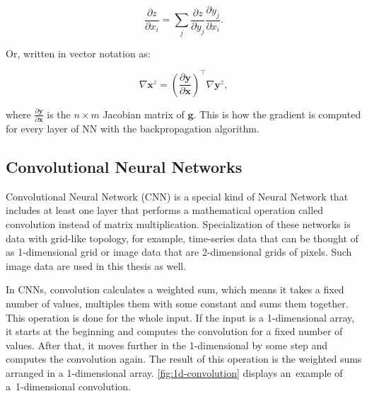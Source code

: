 $$\frac{\partial z}{\partial x_i} = \sum\limits_{j} \frac{\partial z}{\partial y_j} \frac{\partial y_j}{\partial x_i} .$$

\newpage
\noindent Or, written in vector notation as:
    
$$ \nabla \pmb x ^z = \left( \frac{\partial \pmb y }{\partial \pmb x } \right) ^\top \nabla \pmb y ^z ,$$

\noindent where $\frac{\partial \pmb y }{\partial \pmb x }$ is the $n \times m$ Jacobian matrix of $\pmb g$. This is how the gradient is computed for every layer of NN with the backpropagation algorithm.

\subsection*{Convolutional Neural Networks}
Convolutional Neural Network (CNN) is a special kind of Neural Network that includes at least one layer that performs a mathematical operation called convolution instead of matrix multiplication. Specialization of these networks is data with grid-like topology, for example, time-series data that can be thought of as 1-dimensional grid or image data that are 2-dimensional grids of pixels. Such image data are used in this thesis as well.

In CNNs, convolution calculates a weighted sum, which means it takes a fixed number of values, multiples them with some constant and sums them together. This operation is done for the whole input. If the input is a 1-dimensional array, it starts at the beginning and computes the convolution for a fixed number of values. After that, it moves further in the 1-dimensional by some step and computes the convolution again. The result of this operation is the weighted sums arranged in a 1-dimensional array. \autoref{fig:1d-convolution} displays an~example of a~1-dimensional convolution.


